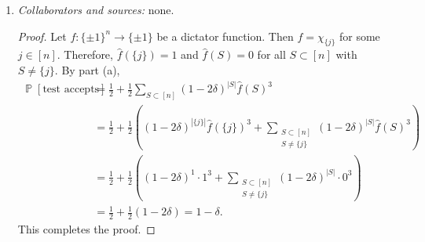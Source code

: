 \documentclass[letterpaper, reqno,11pt]{article}
\newcommand{\PP}{\mathop{{}\mathbb{P}}}
\newcommand{\EE}{\mathop{{}\mathbb{E}}}
\begin{document}
\begin{enumerate}
\begin{enumerate}
\begin{proof}
      \begin{align*}
        \EE\left[\chi_{S \triangle U}(x)\right] &= \frac{1}{2^n} \sum_{x \in \{ \pm 1 \}^n} \chi_{S \triangle U}(x) = \frac{1}{2^n} \sum_{\text{pairs $\left(x, x^{\oplus j}\right)$}} \left(\chi_{S \triangle U}(x) + \chi_{S \triangle U}\left(x^{\oplus j}\right)\right) \\
        &= \frac{1}{2^n} \sum_{\text{pairs $\left(x, x^{\oplus j}\right)$}} \left(x_j \prod_{i \in (S \triangle U) \setminus \{ j \}} x_i + \left(-x_j\right) \prod_{i \in (S \triangle U) \setminus \{ j \}} x_i\right) = 0.
      \end{align*}
      Since $x$, $y$ and $w$ are chosen independently, then for all $S, T, U \subset [n]$ such that either $S \neq U$ or $T \neq U$,
      $$ \EE\left[\chi_{S \triangle U}(x) \chi_{T \triangle U}(y) \chi_U(w)\right] = \EE\left[\chi_{S \triangle U}(x)\right] \EE\left[\chi_{T \triangle U}(y)\right] \EE\left[\chi_U(w)\right] = 0. $$
      Therefore,
      \begin{align*}
        \PP[\text{test accepts}] &= \EE\left[\mathds 1_\text{test accepts}\right] = \EE\left[\frac{1 + f(x)f(y)f(z)}{2}\right] = \frac{1}{2} + \frac{1}{2} \EE[f(x)f(y)f(z)] \\
        &= \frac{1}{2} + \frac{1}{2} \sum_{S, T, U \subset [n]} \hat{f}(S) \hat{f}(T) \hat{f}(U) \EE\left[\chi_{S \triangle U}(x) \chi_{T \triangle U}(y) \chi_U(w)\right] \\
        &= \frac{1}{2} + \frac{1}{2} \sum_{S \subset [n]} (1 - 2\delta)^{|S|} \hat{f}(S)^3.
      \end{align*}
      This completes the proof.
    \end{proof}

    \clearpage

    \item \noindent\emph{Collaborators and sources:} none.
    
    \begin{proof}
      Let $f : \{ \pm 1 \}^n \to \{ \pm 1 \}$ be a dictator function. Then $f = \chi_{\{ j \}}$ for some $j \in [n]$. Therefore, $\hat{f}(\{ j \}) = 1$ and $\hat{f}(S) = 0$ for all $S \subset [n]$ with $S \neq \{ j \}$. By part (a),
      \begin{align*}
        \PP[\text{test accepts}] &= \frac{1}{2} + \frac{1}{2} \sum_{S \subset [n]} (1 - 2\delta)^{|S|} \hat{f}(S)^3 \\
        &= \frac{1}{2} + \frac{1}{2} \left((1 - 2\delta)^{|\{ j \}|} \hat{f}(\{ j \})^3 + \sum_{\substack{S \subset [n] \\ S \neq \{ j \}}} (1 - 2\delta)^{|S|} \hat{f}(S)^3\right) \\
        &= \frac{1}{2} + \frac{1}{2} \left((1 - 2\delta)^1 \cdot 1^3 + \sum_{\substack{S \subset [n] \\ S \neq \{ j \}}} (1 - 2\delta)^{|S|} \cdot 0^3\right) \\
        &= \frac{1}{2} + \frac{1}{2} (1 - 2\delta) = 1 - \delta.
      \end{align*}
      This completes the proof.
    \end{proof}


\end{enumerate}
\end{enumerate}
\end{document}
